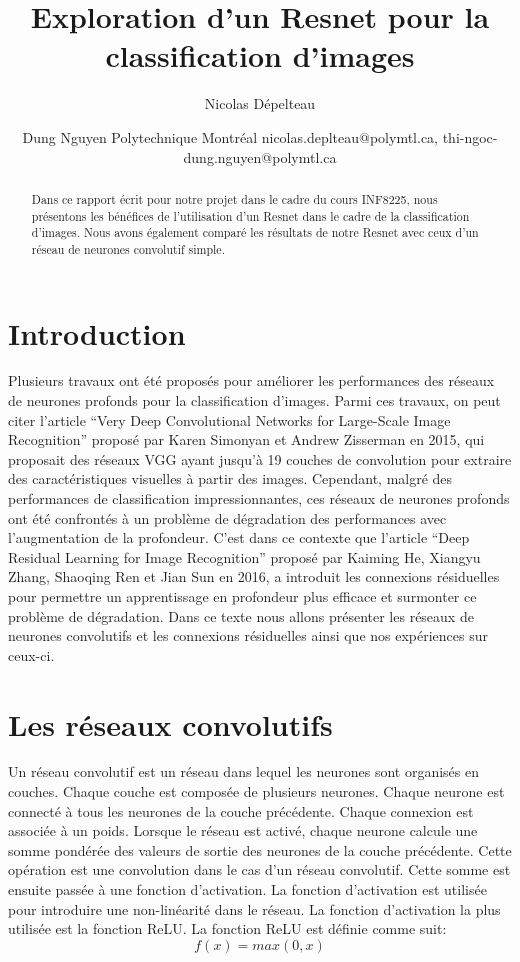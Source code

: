 \documentclass{article}
\title{Exploration d'un Resnet pour la classification d'images}
\author{
Nicolas Dépelteau
\and
Dung Nguyen
\affiliations{}
Polytechnique Montréal
\emails{}
nicolas.deplteau@polymtl.ca,
thi-ngoc-dung.nguyen@polymtl.ca
}
\begin{document}
\maketitle

\begin{abstract}
    Dans ce rapport écrit pour notre projet dans le cadre du cours INF8225,
    nous présentons les bénéfices de l'utilisation
    d'un Resnet dans le cadre de la classification d'images. Nous avons également comparé les
    résultats de notre Resnet avec ceux d'un réseau de neurones convolutif simple. 
\end{abstract}

\section{Introduction}

Plusieurs travaux ont été proposés pour améliorer les performances des réseaux de neurones profonds pour la classification d'images.
Parmi ces travaux, on peut citer l'article ``Very Deep Convolutional Networks for Large-Scale Image Recognition'' proposé par Karen
Simonyan et Andrew Zisserman en 2015, qui proposait des réseaux VGG ayant jusqu'à 19 couches de convolution pour extraire des
caractéristiques visuelles à partir des images.
Cependant, malgré des performances de classification impressionnantes, ces réseaux de neurones profonds ont été confrontés à un
problème de dégradation des performances avec l'augmentation de la profondeur.
C'est dans ce contexte que l'article ``Deep Residual Learning for Image Recognition'' proposé par Kaiming He, Xiangyu Zhang,
Shaoqing Ren et Jian Sun en 2016, a introduit les connexions résiduelles pour permettre un apprentissage en profondeur plus efficace
et surmonter ce problème de dégradation.
Dans ce texte nous allons présenter les réseaux de neurones convolutifs et les connexions résiduelles ainsi que nos expériences
sur ceux-ci.

\section{Les réseaux convolutifs}
Un réseau convolutif est un réseau dans lequel les neurones sont organisés en couches.
Chaque couche est composée de plusieurs neurones. Chaque neurone est connecté à tous les neurones de la couche précédente.
Chaque connexion est associée à un poids. Lorsque le réseau est activé, chaque neurone calcule une somme
pondérée des valeurs de sortie des neurones de la couche précédente.
Cette opération est une convolution dans le cas d'un réseau convolutif.
Cette somme est ensuite passée à une fonction d'activation.
La fonction d'activation est utilisée pour introduire une non-linéarité dans le réseau.
La fonction d'activation la plus utilisée est la fonction ReLU. La fonction ReLU est définie comme suit:
\begin{equation}
    f(x) = max(0, x)
\end{equation}
\end{document}
